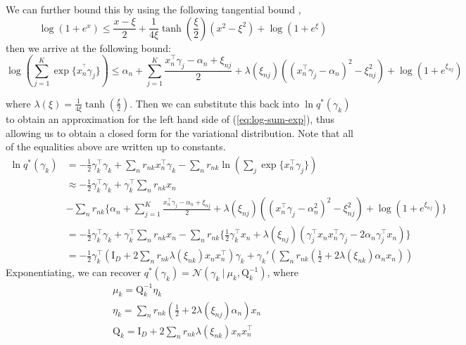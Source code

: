 \documentclass[twoside,11pt]{article}
\newcommand{\tr}{\intercal}
\newcommand{\eye}{\mathrm{I}}
\newcommand\given[1][]{\:#1\vert\:}
\begin{document}
We can further bound this by using the following tangential bound \parencite{jj:2001}, $$\log(1 + e^x) \leq \frac{x - \xi}{2} + \frac{1}{4\xi} \tanh \left( \frac{\xi}{2} \right) (x^2 - \xi^2) + \log\left(1 + e^{\xi}\right)$$ then we arrive at the following bound: 
\begin{equation} \label{eq:jj_bound}
	\log \left( \sum_{j = 1}^K \exp\{ x_n^{^\intercal} \gamma_j \}\right) \leq 
\alpha_n + \sum_{j = 1}^K \frac{x_n^{\intercal} \gamma_j - \alpha_n + \xi_{nj}}{2} + \lambda(\xi_{nj}) \left( (x_n^{\intercal} \gamma_j - \alpha_n)^2 - \xi_{nj}^2\right) + \log \left( 1 + e^{\xi_{nj}}\right)
\end{equation}

where $\lambda(\xi) = \frac{1}{4\xi} \tanh \left( \frac{\xi}{2} \right)$. Then we can substitute this back into $\ln q^{*}(\gamma_k)$ to obtain an approximation for the left hand side of (\ref{eq:log-sum-exp}), thus allowing us to obtain a closed form for the variational distribution. Note that all of the equalities above are written up to constants.
\begin{align*}
    \ln q^{*}(\gamma_k) &= - \frac{1}{2} \gamma_k^{\tr} \gamma_k + \sum_{n} r_{nk} x_n^{\intercal} \gamma_k  - \sum_n r_{nk} \ln \left( \sum_j \exp\{x_n^{\intercal} \gamma_j \} \right)  \\
    & \approx - \frac{1}{2} \gamma_k^{\tr} \gamma_k + \gamma_k^{\intercal} \sum_{n} r_{nk} x_n \\
    & - \sum_n r_{nk} \Bigg\{ \alpha_n + \sum_{j = 1}^K \frac{x_n^{\intercal} \gamma_j - \alpha_n + \xi_{nj}}{2} + \lambda(\xi_{nj}) \left( (x_n^{\intercal} \gamma_j - \alpha_n^2)^2 - \xi_{nj}^2\right) + \log \left( 1 + e^{\xi_{nj}}\right) \Bigg\} \\
    & = - \frac{1}{2} \gamma_k^{\tr} \gamma_k + \gamma_k^{\intercal} \sum_{n} r_{nk} x_n - \sum_n r_{nk} \Bigg\{ \frac{1}{2} \gamma_k^{\tr} x_n + \lambda\left( \xi_{nj} \right) \left( \gamma_j^{\tr}x_n x_n^{\tr} \gamma_j - 2\alpha_n \gamma_j^{\tr} x_n \right)\Bigg\} \\
    &= -\frac{1}{2} \gamma_k^{\tr} \left(\eye_D  + 2 \sum_n r_{nk} \lambda(\xi_{nk}) x_n x_n^{\tr} \right) \gamma_k + \gamma_k' \left( \sum_n r_{nk} \left(\frac{1}{2} + 2 \lambda \left( \xi_{nk}\right) \alpha_n  x_n\right) \right)
\end{align*}
Exponentiating, we can recover $q^{*}(\gamma_k) = \mathcal{N} \left(\gamma_k \given \mu_k, \mathrm{Q}_k^{-1} \right)$, where
\begin{equation} \label{eq:gamma_params}
\begin{split}
	& \mu_k = \mathrm{Q}_k^{-1} \eta_k \\
	& \eta_k = \sum_{n} r_{nk} \left( \frac{1}{2} + 2 \lambda(\xi_{nj}) \alpha_n \right) x_n \\
	& \mathrm{Q}_k = \eye_D + 2 \sum_{n} r_{nk} \lambda(\xi_{nk}) x_n x_n^{\tr}
\end{split}
\end{equation}
\end{document}
